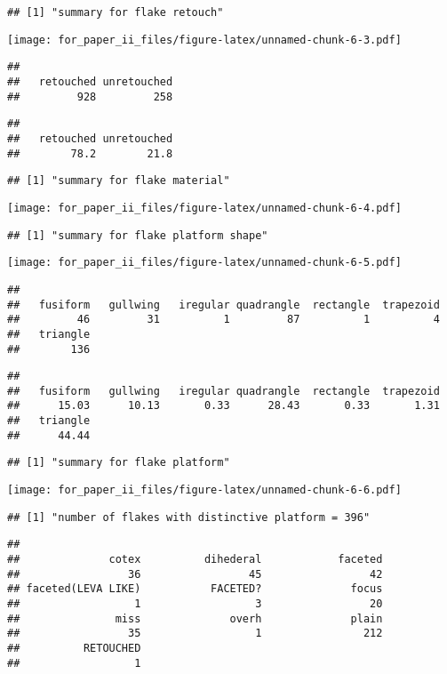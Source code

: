 \documentclass[]{article}
\begin{document}
\begin{verbatim}
## [1] "summary for flake retouch"
\end{verbatim}

\texttt{[image: for\_paper\_ii\_files/figure-latex/unnamed-chunk-6-3.pdf]}

\begin{verbatim}
## 
##   retouched unretouched 
##         928         258
\end{verbatim}

\begin{verbatim}
## 
##   retouched unretouched 
##        78.2        21.8
\end{verbatim}

\begin{verbatim}
## [1] "summary for flake material"
\end{verbatim}

\texttt{[image: for\_paper\_ii\_files/figure-latex/unnamed-chunk-6-4.pdf]}

\begin{verbatim}
## [1] "summary for flake platform shape"
\end{verbatim}

\texttt{[image: for\_paper\_ii\_files/figure-latex/unnamed-chunk-6-5.pdf]}

\begin{verbatim}
## 
##   fusiform   gullwing   iregular quadrangle  rectangle  trapezoid 
##         46         31          1         87          1          4 
##   triangle 
##        136
\end{verbatim}

\begin{verbatim}
## 
##   fusiform   gullwing   iregular quadrangle  rectangle  trapezoid 
##      15.03      10.13       0.33      28.43       0.33       1.31 
##   triangle 
##      44.44
\end{verbatim}

\begin{verbatim}
## [1] "summary for flake platform"
\end{verbatim}

\texttt{[image: for\_paper\_ii\_files/figure-latex/unnamed-chunk-6-6.pdf]}

\begin{verbatim}
## [1] "number of flakes with distinctive platform = 396"
\end{verbatim}

\begin{verbatim}
## 
##              cotex          dihederal            faceted 
##                 36                 45                 42 
## faceted(LEVA LIKE)           FACETED?              focus 
##                  1                  3                 20 
##               miss              overh              plain 
##                 35                  1                212 
##          RETOUCHED 
##                  1
\end{verbatim}
\end{document}
